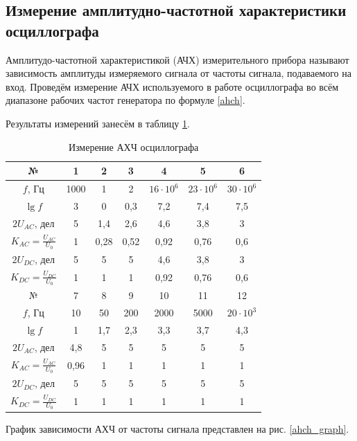 \documentclass[a4paper,12pt]{article} %
\begin{document}
\subsection{Измерение амплитудно-частотной характеристики осциллографа}

Амплитудо-частотной характеристикой (АЧХ) измерительного прибора называют зависимость амплитуды измеряемого
сигнала от частоты сигнала, подаваемого на вход. Проведём измерение АЧХ используемого в работе осциллографа во всём диапазоне
рабочих частот генератора по формуле \eqref{ahch}.

Результаты измерений занесём в таблицу \ref{tab:ahch}.

\begin{table}[H]
	\centering
	\begin{tabular}{|c|c|c|c|c|c|c|}
		\hline
		№ & 1 & 2 & 3 & 4 & 5 & 6 \\ \hline
		$ f $, Гц & 1000 & 1 & 2 & $ 16\cdot10^6 $ & $ 23\cdot10^6 $ & $ 30\cdot10^6 $ \\ \hline
		$ \lg f $ & 3 & 0 & 0,3 & 7,2 & 7,4 & 7,5 \\ \hline
		$ 2U_{AC} $, дел & 5 & 1,4 & 2,6 & 4,6 & 3,8 & 3 \\ \hline
		$ K_{AC} = \frac{U_{AC}}{U_0} $ & 1 & 0,28 & 0,52 & 0,92 & 0,76 & 0,6 \\ \hline
		$ 2U_{DC} $, дел & 5 & 5 & 5 & 4,6 & 3,8 & 3 \\ \hline
		$ K_{DC} = \frac{U_{DC}}{U_0} $ & 1 & 1 & 1 & 0,92 & 0,76 & 0,6 \\ \hline \hline
		№ & 7 & 8 & 9 & 10 & 11 & 12 \\ \hline
		$ f $, Гц & 10 & 50 & 200 & 2000 & 5000 & $ 20 \cdot 10^3 $ \\ \hline
		$ \lg f $ & 1 & 1,7 & 2,3 & 3,3 & 3,7 & 4,3 \\ \hline
		$ 2U_{AC} $, дел & 4,8 & 5 & 5 & 5 & 5 & 5 \\ \hline
		$ K_{AC} = \frac{U_{AC}}{U_0} $ & 0,96 & 1 & 1 & 1 & 1 & 1 \\ \hline
		$ 2U_{DC} $, дел & 5 & 5 & 5 & 5 & 5 & 5 \\ \hline
		$ K_{DC} = \frac{U_{DC}}{U_0} $ & 1 & 1 & 1 & 1 & 1 & 1 \\ \hline
	\end{tabular}
	\caption{Измерение АХЧ осциллографа}
	\label{tab:ahch}
\end{table}
График зависимости АХЧ от частоты сигнала представлен на рис. \ref{ahch_graph}.
\end{document}
